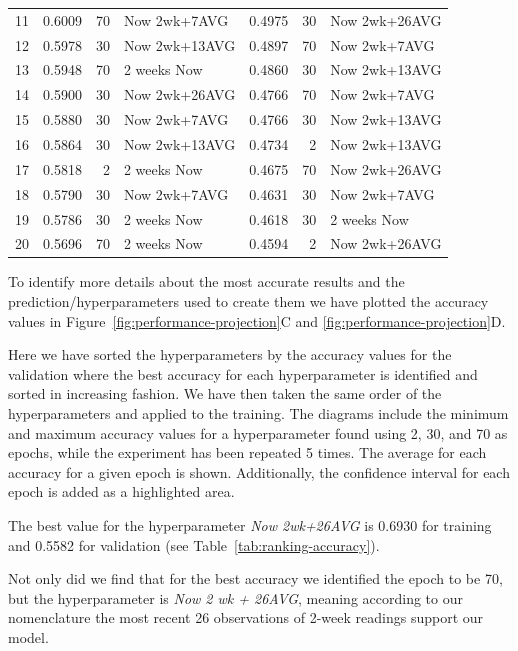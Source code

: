 \documentclass[utf8]{FrontiersinVancouver} %
\begin{document}
\begin{table}[htb]
\begin{center}
{\begin{tabular}{|l||r|r|l|r|r|l|}
11 &  0.6009 &     70 &   Now 2wk+7AVG &  0.4975 &     30 &  Now 2wk+26AVG \\
12 &  0.5978 &     30 &  Now 2wk+13AVG &  0.4897 &     70 &   Now 2wk+7AVG \\
13 &  0.5948 &     70 &    2 weeks Now &  0.4860 &     30 &  Now 2wk+13AVG \\
14 &  0.5900 &     30 &  Now 2wk+26AVG &  0.4766 &     70 &   Now 2wk+7AVG \\
15 &  0.5880 &     30 &   Now 2wk+7AVG &  0.4766 &     30 &  Now 2wk+13AVG \\
16 &  0.5864 &     30 &  Now 2wk+13AVG &  0.4734 &      2 &  Now 2wk+13AVG \\
17 &  0.5818 &      2 &    2 weeks Now &  0.4675 &     70 &  Now 2wk+26AVG \\
18 &  0.5790 &     30 &   Now 2wk+7AVG &  0.4631 &     30 &   Now 2wk+7AVG \\
19 &  0.5786 &     30 &    2 weeks Now &  0.4618 &     30 &    2 weeks Now \\
20 &  0.5696 &     70 &    2 weeks Now &  0.4594 &      2 &  Now 2wk+26AVG \\
\hline
\end{tabular}
}
\end{center}
\end{table}

To identify more details about the most accurate results and the prediction/hyperparameters used to create them we have plotted the accuracy values in Figure~\ref{fig:performance-projection}C and \ref{fig:performance-projection}D. 

Here we have sorted the hyperparameters by the accuracy values for the validation where the best accuracy for each hyperparameter is identified and sorted in increasing fashion. We have then taken the same order of the hyperparameters and applied to the training.
The diagrams include the minimum and maximum accuracy values for a hyperparameter found using 2, 30, and 70 as epochs, while the experiment has been repeated 5 times. The average for each accuracy for a given epoch is shown. Additionally, the confidence interval for each epoch is added as a highlighted area.

The best value for the hyperparameter {\em Now 2wk+26AVG} is 0.6930 for training and 0.5582 for validation (see Table~\ref{tab:ranking-accuracy}).

Not only did we find that for the best accuracy we identified the epoch to be 70, but the hyperparameter is {\em Now 2 wk + 26AVG}, meaning according to our nomenclature the most recent 26 observations of 2-week readings support our model.
\end{document}
